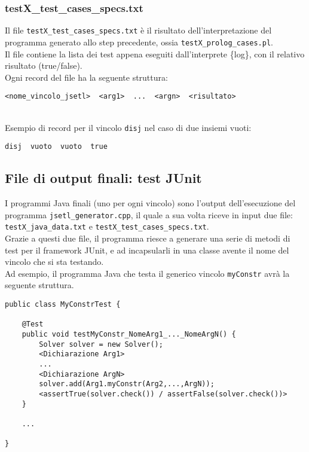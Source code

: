 \subsubsection{testX\_test\_cases\_specs.txt}
Il file \texttt{testX\_test\_cases\_specs.txt} è il risultato dell'interpretazione del programma generato allo step precedente, ossia \texttt{testX\_prolog\_cases.pl}.\\
Il file contiene la lista dei test appena eseguiti dall'interprete \{log\}, con il relativo risultato (true/false).\\
Ogni record del file ha la seguente struttura:
\begin{verbatim}
<nome_vincolo_jsetl>  <arg1>  ...  <argn>  <risultato>
\end{verbatim}

\\Esempio di record per il vincolo \texttt{disj} nel caso di due insiemi vuoti:
\begin{verbatim}
disj  vuoto  vuoto  true
\end{verbatim}

\subsection{File di output finali: test JUnit}
I programmi Java finali (uno per ogni vincolo) sono l'output dell'esecuzione del programma \texttt{jsetl\_generator.cpp}, il quale a sua volta riceve in input due file:\\
\texttt{testX\_java\_data.txt} e \texttt{testX\_test\_cases\_specs.txt}.\\
Grazie a questi due file, il programma riesce a generare una serie di metodi di test per il framework JUnit, e ad incapsularli in una classe avente il nome del vincolo che si sta testando.\\
Ad esempio, il programma Java che testa il generico vincolo \texttt{myConstr} avrà la seguente struttura.
\clearpage

\begin{lstlisting}
public class MyConstrTest {
	
    @Test
    public void testMyConstr_NomeArg1_..._NomeArgN() {
        Solver solver = new Solver();
        <Dichiarazione Arg1>
        ...
        <Dichiarazione ArgN>    
        solver.add(Arg1.myConstr(Arg2,...,ArgN));    
        <assertTrue(solver.check()) / assertFalse(solver.check())>
    }
    
    ...
    
}
\end{lstlisting}

